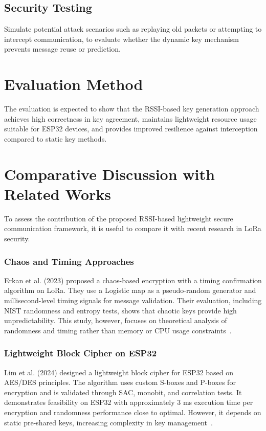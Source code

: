 \subsection{Security Testing}
Simulate potential attack scenarios such as replaying old packets or attempting to intercept communication, to evaluate whether the dynamic key mechanism prevents message reuse or prediction.

 \section{Evaluation Method}
 The evaluation is expected to show that the RSSI-based key generation approach achieves high correctness in key agreement, maintains lightweight resource usage suitable for ESP32 devices, and provides improved resilience against interception compared to static key methods.

\section{Comparative Discussion with Related Works}

To assess the contribution of the proposed RSSI-based lightweight secure communication framework, it is useful to compare it with recent research in LoRa security.

\subsubsection{Chaos and Timing Approaches}
Erkan et al. (2023) proposed a chaos-based encryption with a timing confirmation algorithm on LoRa. They use a Logistic map as a pseudo-random generator and millisecond-level timing signals for message validation. Their evaluation, including NIST randomness and entropy tests, shows that chaotic keys provide high unpredictability. This study, however, focuses on theoretical analysis of randomness and timing rather than memory or CPU usage constraints~\cite{erkan2023secure}.

\subsubsection{Lightweight Block Cipher on ESP32}
Lim et al. (2024) designed a lightweight block cipher for ESP32 based on AES/DES principles. The algorithm uses custom S-boxes and P-boxes for encryption and is validated through SAC, monobit, and correlation tests. It demonstrates feasibility on ESP32 with approximately 3 ms execution time per encryption and randomness performance close to optimal. However, it depends on static pre-shared keys, increasing complexity in key management~\cite{ni2024esp32crypto}.

